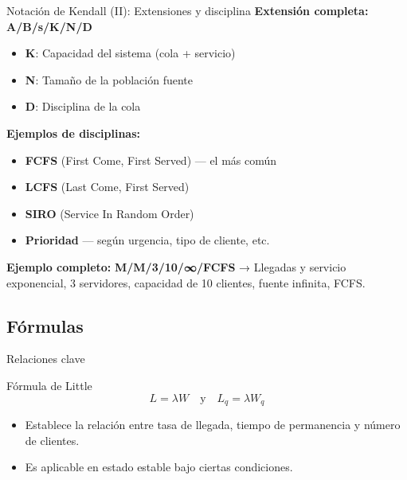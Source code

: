 \documentclass{beamer}
\begin{document}
\begin{frame}{Notación de Kendall (II): Extensiones y disciplina}
\textbf{Extensión completa:} \quad \textbf{A/B/s/K/N/D}

\vspace{0.3cm}
\begin{itemize}
    \item \textbf{K}: Capacidad del sistema (cola + servicio)
    \item \textbf{N}: Tamaño de la población fuente
    \item \textbf{D}: Disciplina de la cola
\end{itemize}

\vspace{0.3cm}
\textbf{Ejemplos de disciplinas:}
\begin{itemize}
    \item \textbf{FCFS} (First Come, First Served) — el más común
    \item \textbf{LCFS} (Last Come, First Served)
    \item \textbf{SIRO} (Service In Random Order)
    \item \textbf{Prioridad} — según urgencia, tipo de cliente, etc.
\end{itemize}

\vspace{0.3cm}
\textbf{Ejemplo completo:}  
\textbf{M/M/3/10/∞/FCFS}  
→ Llegadas y servicio exponencial, 3 servidores, capacidad de 10 clientes, fuente infinita, FCFS.
\end{frame}

\subsection{Fórmulas}
\begin{frame}{Relaciones clave}
\vspace{-0.4cm}
\begin{block}{Fórmula de Little}
\[
L = \lambda W \quad\text{y}\quad L_q = \lambda W_q
\]
\end{block}
\begin{itemize}
    \item Establece la relación entre tasa de llegada, tiempo de permanencia y número de clientes.
    \item Es aplicable en estado estable bajo ciertas condiciones.
\end{itemize}
\end{frame}
\end{document}

